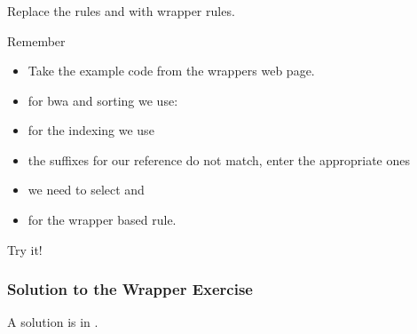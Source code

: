 \begin{frame}
	\frametitle{}
	\setcounter{handson}{\value{preframe_handson}}
	Replace the rules  and  with wrapper rules.
	\begin{hint}
		Remember
		\begin{itemize}
			\item Take the example code from the wrappers web page.
			\item for bwa and sorting we use: 
			\item for the indexing we use 
			\item the suffixes for our reference do not match, enter the appropriate ones
			\item we need to select  and
			\item {} for the wrapper based  rule.
		\end{itemize}
	\end{hint}
    
    \begin{task}
    	Try it!
    \end{task}
\end{frame}

\begin{frame}
  \frametitle{Solution to the Wrapper Exercise}
  A solution is in .
\end{frame}
